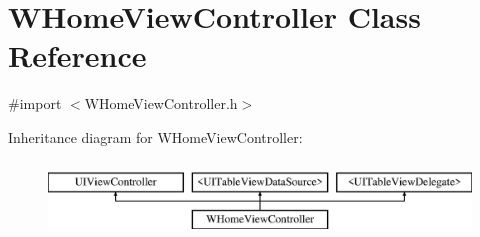 \hypertarget{interface_w_home_view_controller}{\section{W\-Home\-View\-Controller Class Reference}
\label{interface_w_home_view_controller}
}


{\ttfamily \#import $<$W\-Home\-View\-Controller.\-h$>$}

Inheritance diagram for W\-Home\-View\-Controller\-:\begin{figure}[H]
\begin{center}
\leavevmode
\includegraphics[height=2.000000cm]{interface_w_home_view_controller}
\end{center}
\end{figure}
